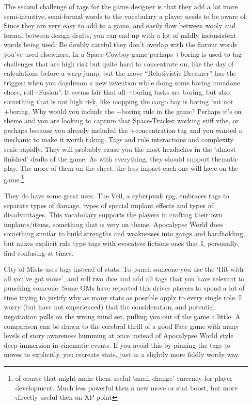 \documentclass{tufte-handout}
\begin{document}
The second challenge of tags for the game designer is that they add a lot more semi-intuitive, semi-formal   words to the vocabulary a player needs to be aware of.  Since they are very easy to add to a game, and easily flow between wooly and formal between design drafts, you can end up with a lot of mildly inconsistent words being used. Be doubly careful they don't overlap with the flavour words you've used elsewhere. In a Space-Cowboy game perhaps +boring is used to tag challenges that are high risk but quite hard to concentrate on, like the day of calculations before a warp-jump, but the move ``Relativistic Dreamer'' has the trigger: when you daydream a new invention while doing some boring mundane chore, roll+Fusion''. It seems fair that all +boring tasks are boring, but also something that is not high risk, like mopping the cargo bay is boring but not +boring.
Why would you include the +boring rule in the game? Perhaps it's on theme and you are looking to capture that Space-Trucker working stiff vibe, or perhaps because you already included the +concentration tag and you wanted a mechanic to make it worth taking. Tags and rule interactions and complexity scale rapidly. They will probably cause you the most headaches in the `almost finished' drafts of the game. As with everything, they should support thematic play. The more of them on the sheet, the less impact each one will have on the game.\footnote{of course that might make them useful `small change' currency for player development. Much less powerful then a new move or stat boost, but more directly useful then an XP point}

They do have some great uses. The Veil, a cyberpunk rpg, embraces tags to separate types of damage, types of special implant effects and types of disadvantages. This vocabulary supports the players in crafting their own implants/items, something that is very on theme. Apocalypse World does something similar to build strengths and weaknesses into gangs and hardholding, but mixes explicit rule type tags with evocative fictions ones that I, personally, find confusing at times.

City of Mists uses tags instead of stats. To punch someone you use the `Hit with all you've got move', and roll two dice and add all tags that you have relevant to punching someone. Some GMs have reported this drives players to spend a lot of time trying to justify why as many stats as possible apply to every single role. I worry (but have not experienced) that the consideration, and potential negotiation pulls on the wrong mind set, pulling you out of the game a little. A comparison can be drawn to the cerebral thrill of a good Fate game with many levels of story awareness humming at once instead of Apocalypse World style deep immersion in cinematic events. If you avoid this by pinning the tags to moves to explicitly, you recreate stats, just in a slightly more fiddly wordy way.
\end{document}
